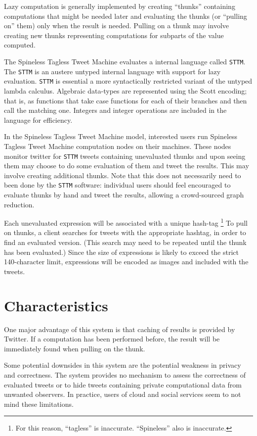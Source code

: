 \documentclass[preprint]{sigplanconf}
\renewcommand{\t}{\texttt}
\begin{document}
Lazy computation is generally implemented by creating ``thunks''
containing computations that might be needed later and evaluating the
thunks (or ``pulling on'' them) only when the result is
needed. Pulling on a thunk may involve creating new thunks
representing computations for subparts of the value computed.

The Spineless Tagless Tweet Machine evaluates a internal language
called \t{STTM}. The \t{STTM} is an austere untyped internal language
with support for lazy evaluation. \t{STTM} is essential a more
syntactically restricted variant of the untyped lambda calculus.
Algebraic data-types are represented
using the Scott encoding; that is, as functions that take case
functions for each of their branches and then call the matching one.
Integers and integer operations are included in the language for
efficiency.

In the Spineless Tagless Tweet Machine model, interested users run
Spineless Tagless Tweet Machine computation nodes on their
machines. These nodes monitor twitter for \t{STTM} tweets containing
unevaluated thunks and upon seeing them may choose to do some
evaluation of them and tweet the results. This may involve creating
additional thunks. Note that this does not necessarily need to been
done by the \t{STTM} software: individual users should feel encouraged
to evaluate thunks by hand and tweet the results, allowing a
crowd-sourced graph reduction.

Each unevaluated expression will be associated with a unique
hash-tag \footnote{For this reason, ``tagless'' is
  inaccurate. ``Spineless'' also is inaccurate.}  To pull on thunks, a
client searches for tweets with the appropriate hashtag, in order to
find an evaluated version. (This search may need to be repeated until
the thunk has been evaluated.) Since the size of expressions is likely
to exceed the strict 140-character limit, expressions will be encoded
as images and included with the tweets.

\section{Characteristics}
One major advantage of this system is that caching of results is
provided by Twitter. If a computation has been performed before, the
result will be immediately found when pulling on the thunk.

Some potential downsides in this system are the potential weakness in
privacy and correctness. The system provides no mechanism to assess
the correctness of evaluated tweets or to hide tweets containing
private computational data from unwanted observers. In practice, users
of cloud and social services seem to not mind these limitations.
\end{document}
